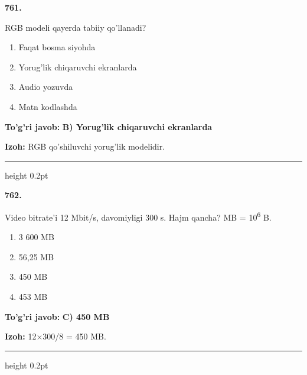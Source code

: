 \documentclass[10pt,a4paper,oneside]{article}
\begin{document}
\noindent\textbf{\color{ink}761.}
\par
RGB modeli qayerda tabiiy qo'llanadi?
\begin{enumerate}[label=\Alph*),leftmargin=9mm]
\item Faqat bosma siyohda
\item Yorug'lik chiqaruvchi ekranlarda
\item Audio yozuvda
\item Matn kodlashda
\end{enumerate}
\begin{tcolorbox}[enhanced,breakable,colback=teal!4,colframe=teal!50!black,boxrule=0.5pt,arc=1.1mm,left=3mm,right=3mm,top=1.7mm,bottom=1.7mm,before skip=2mm,after skip=2mm]
\textbf{\color{teal}To'g'ri javob:} \textbf{B) Yorug'lik chiqaruvchi ekranlarda}
\par\smallskip
\textbf{Izoh:} RGB qo'shiluvchi yorug'lik modelidir.
\end{tcolorbox}
\vspace{2mm}\hrule height 0.2pt \vspace{3mm}

\noindent\textbf{\color{ink}762.}
\par
Video bitrate'i 12 Mbit/s, davomiyligi 300 s. Hajm qancha? MB = 10\textsuperscript{6} B.
\begin{enumerate}[label=\Alph*),leftmargin=9mm]
\item 3 600 MB
\item 56,25 MB
\item 450 MB
\item 453 MB
\end{enumerate}
\begin{tcolorbox}[enhanced,breakable,colback=teal!4,colframe=teal!50!black,boxrule=0.5pt,arc=1.1mm,left=3mm,right=3mm,top=1.7mm,bottom=1.7mm,before skip=2mm,after skip=2mm]
\textbf{\color{teal}To'g'ri javob:} \textbf{C) 450 MB}
\par\smallskip
\textbf{Izoh:} 12\ensuremath{\times}300/8 = 450 MB.
\end{tcolorbox}
\vspace{2mm}\hrule height 0.2pt \vspace{3mm}
\end{document}

